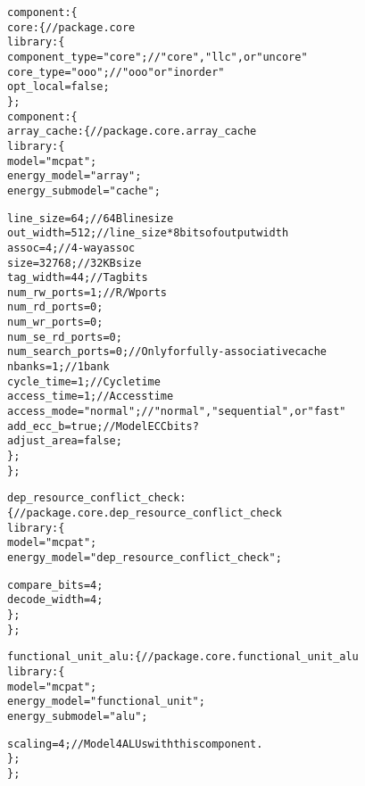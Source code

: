 {\begin{alltt}
        component: \{
            core: \{ // package.core
                library: \{
                    component_type = "core"; // "core", "llc", or "uncore"
                    core_type = "ooo"; // "ooo" or "inorder"
                    opt_local = false;
                \};
                component: \{
                    array\_cache: \{ // package.core.array\_cache
                        library: \{
                            model = "mcpat";
                            energy_model = "array";
                            energy_submodel = "cache";

                            line_size = 64; // 64B line size
                            out_width = 512; // line_size*8 bits of output width
                            assoc = 4; // 4-way assoc
                            size = 32768; // 32KB size
                            tag_width = 44; // Tag bits
                            num_rw_ports = 1; // R/W ports
                            num_rd_ports = 0;
                            num_wr_ports = 0;
                            num_se_rd_ports = 0;
                            num_search_ports = 0; // Only for fully-associative cache
                            nbanks = 1; // 1 bank
                            cycle_time = 1; // Cycle time
                            access_time = 1; // Access time
                            access_mode = "normal"; // "normal", "sequential", or "fast"
                            add_ecc_b = true; // Model ECC bits?
                            adjust_area = false;
                        \};
                    \};

                    dep\_resource\_conflict\_check: \{ // package.core.dep\_resource\_conflict\_check
                        library: \{
                            model = "mcpat";
                            energy_model = "dep_resource_conflict_check";

                            compare_bits = 4;
                            decode_width = 4;
                        \};
                    \};
                    
                    functional\_unit\_alu: \{ // package.core.functional\_unit\_alu
                        library: \{
                            model = "mcpat";
                            energy_model = "functional_unit";
                            energy_submodel = "alu";
                            
                            scaling = 4; // Model 4 ALUs with this component.
                        \};
                    \};
                    

\end{alltt}}
